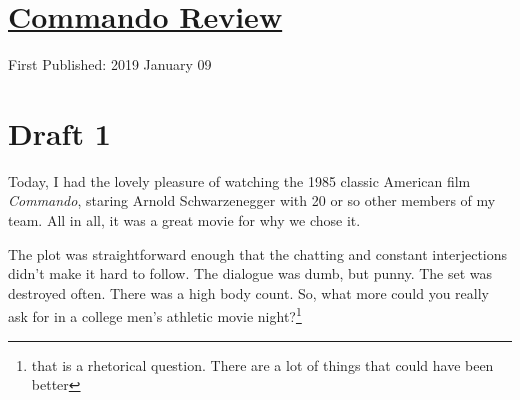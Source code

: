 \documentclass[12pt]{article}[titlepage]
\newcommand{\1}{\={a}}
\newcommand{\2}{\={e}}
\newcommand{\3}{\={\i}}
\newcommand{\4}{\=o}
\newcommand{\5}{\=u}
\newcommand{\6}{\={A}}
\renewcommand{\,}{\textsuperscript{,}}
\begin{document}
\doublespacing
\section{\href{commando.html}{Commando Review}}
First Published: 2019 January 09
\section{Draft 1}
Today, I had the lovely pleasure of watching the 1985 classic American film \textit{Commando}, staring Arnold Schwarzenegger with 20 or so other members of my team.
All in all, it was a great movie for why we chose it.

The plot was straightforward enough that the chatting and constant interjections didn't make it hard to follow.
The dialogue was dumb, but punny.
The set was destroyed often.
There was a high body count.
So, what more could you really ask for in a college men's athletic movie night?\footnote{that is a rhetorical question. There are a lot of things that could have been better}
\end{document}
